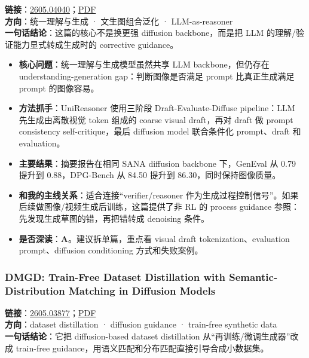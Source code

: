 \textbf{链接}：\href{https://arxiv.org/abs/2605.04040}{2605.04040}；\href{https://arxiv.org/pdf/2605.04040}{PDF}\\
\textbf{方向}：统一理解与生成 · 文生图组合泛化 · LLM-as-reasoner\\
\textbf{一句话结论}：这篇的核心不是换更强 diffusion backbone，而是把 LLM 的理解/验证能力显式转成生成时的 corrective guidance。

\begin{itemize}[leftmargin=1.5em]
  \item \textbf{核心问题}：统一理解与生成模型虽然共享 LLM backbone，但仍存在 understanding-generation gap：判断图像是否满足 prompt 比真正生成满足 prompt 的图像容易。
  \item \textbf{方法抓手}：UniReasoner 使用三阶段 Draft-Evaluate-Diffuse pipeline：LLM 先生成由离散视觉 token 组成的 coarse visual draft，再对 draft 做 prompt consistency self-critique，最后 diffusion model 联合条件化 prompt、draft 和 evaluation。
  \item \textbf{主要结果}：摘要报告在相同 SANA diffusion backbone 下，GenEval 从 0.79 提升到 0.88，DPG-Bench 从 84.50 提升到 86.30，同时保持图像质量。
  \item \textbf{和我的主线关系}：适合连接“verifier/reasoner 作为生成过程控制信号”。如果后续做图像/视频生成后训练，这篇提供了非 RL 的 process guidance 参照：先发现生成草图的错，再把错转成 denoising 条件。
  \item \textbf{是否深读}：\textbf{A}。建议拆单篇，重点看 visual draft tokenization、evaluation prompt、diffusion conditioning 方式和失败案例。
\end{itemize}

\subsubsection{DMGD: Train-Free Dataset Distillation with Semantic-Distribution Matching in Diffusion Models}

\textbf{链接}：\href{https://arxiv.org/abs/2605.03877}{2605.03877}；\href{https://arxiv.org/pdf/2605.03877}{PDF}\\
\textbf{方向}：dataset distillation · diffusion guidance · train-free synthetic data\\
\textbf{一句话结论}：它把 diffusion-based dataset distillation 从“再训练/微调生成器”改成 train-free guidance，用语义匹配和分布匹配直接引导合成小数据集。

